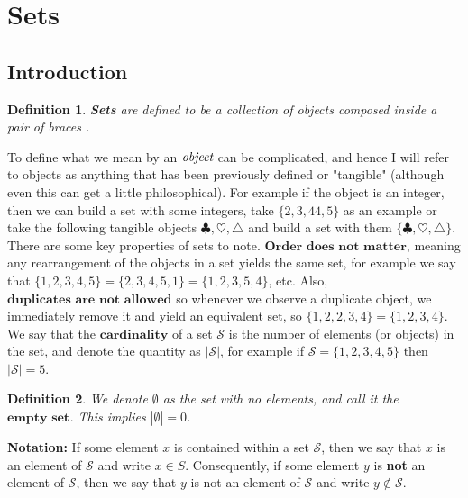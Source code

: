 \documentclass[12pt]{article}
\theoremstyle{break}
\newtheorem{defn}{Definition}[subsection]
\begin{document}
\let\ref\Cref
\section{Sets}
\subsection{Introduction}
\begin{defn}
\textbf{Sets} are defined to be a collection of \emph{objects} composed inside a pair of braces {}.
\end{defn}
To define what we mean by an $\emph{object}$ can be complicated, and hence I will refer to objects as anything that has been previously defined or "tangible" (although even this can get a little philosophical). For example if the object is an integer, then we can build a set with some integers, take $\{2,3,44,5\}$ as an example or take the following tangible objects $\clubsuit, \heartsuit, \triangle$ and build a set with them $\{\clubsuit, \heartsuit, \triangle \}$. There are some key properties of sets to note. $\textbf{Order does not matter}$, meaning any rearrangement of the objects in a set yields the same set, for example we say that $\{1,2,3,4,5\} = \{2,3,4,5,1\} = \{1,2,3,5,4\}$, etc. Also, $\textbf{duplicates are not allowed}$ so whenever we observe a duplicate object, we immediately remove it and yield an equivalent set, so $\{1,2,2,3,4\} = \{1,2,3,4\}$. We say that the $\textbf{cardinality}$ of a set $\mathcal{S}$ is the number of elements (or objects) in the set, and denote the quantity as $|\mathcal{S}|$, for example if $\mathcal{S} = \{1,2,3,4,5\}$ then $|\mathcal{S}| = 5$.

\begin{defn}
    We denote $\emptyset$ as the set with no elements, and call it the $\textbf{empty set}$. This implies $|\emptyset| = 0$.
  \end{defn}
  
  
\textbf{Notation:} If some element $x$ is contained within a set $\mathcal{S}$, then we say that $x$ is an element of $\mathcal{S}$ and write $x\in S$. Consequently, if some element $y$ is \textbf{not} an element of $\mathcal{S}$, then we say that $y$ is not an element of $\mathcal{S}$ and write $y\not\in \mathcal{S}$.


\end{document}
